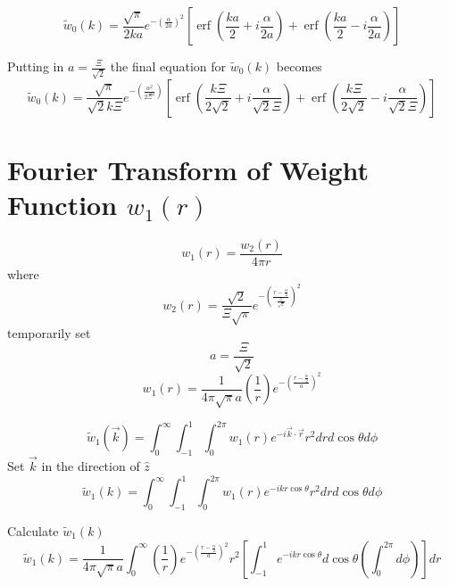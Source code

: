 \documentclass[double,12pt]{beavtex}
\begin{document}
\begin{equation}{\widetilde{w}_0(k)=\frac{\sqrt{\pi}}{2ka}e^{-\left(\frac{\alpha}{2a}\right)^2}\left[\operatorname{erf}\left(\frac{ka}{2}+i\frac{\alpha}{2a}\right)+\operatorname{erf}\left(\frac{ka}{2}-i\frac{\alpha}{2a}\right)\right]}\end{equation}
 
Putting in $a=\frac{\Xi}{\sqrt{2}}$ the final equation for $\widetilde{w}_0(k)$ becomes
\begin{equation}{\widetilde{w}_0(k)=\frac{\sqrt{\pi}}{\sqrt{2}k\Xi}e^{-\left(\frac{\alpha^2}{2\Xi^2}\right)}\left[\operatorname{erf}\left(\frac{k\Xi}{2\sqrt{2}}+i\frac{\alpha}{\sqrt{2}\Xi}\right)+\operatorname{erf}\left(\frac{k\Xi}{2\sqrt{2}}-i\frac{\alpha}{\sqrt{2}\Xi}\right)\right]}\end{equation}

\section{Fourier Transform of Weight Function $w_{1}(r)$}
\begin{equation}{w_1(r)=\frac{w_2(r)}{4{\pi}r}}\end{equation}
where
\begin{equation}{w_2(r)=\frac{\sqrt{2}}{\Xi\sqrt{\pi}}e^{-\left(\frac{r-\frac{\alpha}{2}}{\frac{\Xi}{\sqrt{2}}}\right)^2}}\end{equation}
temporarily set 
\begin{equation}{a=\frac{\Xi}{\sqrt{2}}}\end{equation}
\begin{equation}{w_1(r)=\frac{1}{4{\pi}\sqrt{\pi}a}\left(\frac{1}{r}\right)e^{-\left(\frac{r-\frac{\alpha}{2}}{a}\right)^2}}\end{equation}

\begin{equation}{\widetilde{w}_1(\vec{k})=\int_{0}^{\infty}\int_{-1}^{1}\int_{0}^{2\pi}w_1(r)e^{-i\vec{k}\cdot{\vec{r}}}r^2d{r}d{\cos\theta}d{\phi}}\end{equation}
Set $\vec{k}$ in the direction of $\hat{z}$ 
\begin{equation}{\widetilde{w}_1(k)=\int_{0}^{\infty}\int_{-1}^{1}\int_{0}^{2\pi}w_1(r)e^{-ikr\cos\theta}r^2d{r}d{\cos\theta}d{\phi}}\end{equation}

\noindent Calculate $\widetilde{w}_1(k)$ 
\begin{equation}{\widetilde{w}_1(k)=\frac{1}{4{\pi}\sqrt{\pi}a}\int_{0}^{\infty}\left(\frac{1}{r}\right)e^{-\left(\frac{r-\frac{\alpha}{2}}{a}\right)^2}r^2\left[\int_{-1}^{1}e^{-ikr\cos\theta}d{\cos\theta}\left(\int_{0}^{2\pi}d{\phi}\right)\right]d{r}}\end{equation}
\end{document}
